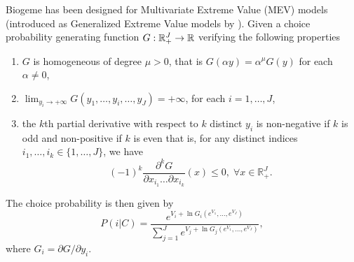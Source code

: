 \documentclass[12pt]{memoir}
\begin{document}
   Biogeme has been designed for Multivariate Extreme Value (MEV)
   models (introduced as Generalized Extreme Value models by
   \cite{McFa78}). Given a choice probability generating function
   $G:\mathbb{R}_+^J\to \mathbb{R}$ verifying the following properties 
   \begin{enumerate} 
      \item\label{prop1} $G$ is homogeneous of degree $\mu > 0$, that
        is $G(\alpha y) = \alpha^\mu G(y)$ for each $\alpha \neq 0$,
      \item\label{prop2} $\lim_{y_i \rightarrow +\infty} G(y_1,\ldots,y_i,\ldots,y_J) = +\infty$, for each $i=1,\ldots,J$,
      \item\label{prop3} the $k$\/th partial derivative with respect to $k$ distinct $y_i$ is non-negative if $k$ is odd and non-positive if $k$ is even that is, for any distinct indices $i_1,\ldots, i_k \in \{1,\ldots, J \}$, we have
         \begin{equation}
         (-1)^k \frac{\partial^k G }{\partial x_{i_1}\ldots\partial x_{i_k}}(x) \leq 0, 
         \; \forall x \in \mathbb{R}_+^J.
         \end{equation}
   \end{enumerate}
   The choice probability is then given by
   \begin{equation}
   P(i|C) = \frac{e^{V_i + \ln G_i(e^{V_1},\ldots,e^{V_J})}}{\sum_{j=1}^J e^{V_j + \ln G_j(e^{V_1},\ldots,e^{V_J})}},
   \end{equation}
   where $G_i = \partial G/\partial y_i$.

   
\end{document}
